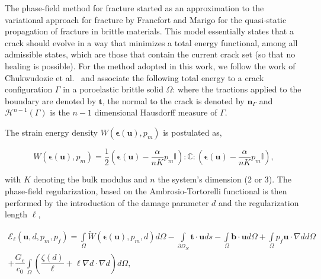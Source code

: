 The phase-field method for fracture started as an approximation \cite{bourdin2000numerical} to the variational approach for fracture by Francfort and Marigo \cite{francfort1998revisiting} for the quasi-static propagation of fracture in brittle materials. This model essentially states that a crack should evolve in a way that minimizes a total energy functional, among all admissible states, which are those that contain the current crack set (so that no healing is possible). For the method adopted in this work, we follow the work of Chukwudozie et al.\ \cite{chukwudozie2019variational} and associate the following total energy to a crack configuration $\Gamma$ in a poroelastic brittle solid $\Omega$:
where the tractions applied to the boundary are denoted by $\textbf{t}$, the normal to the crack is denoted by $\textbf{n}_{\Gamma}$ and $\mathcal{H}^{n-1}(\Gamma)$ is the $n-1$ dimensional Hausdorff measure of $\Gamma$. 

The strain energy density $W(\boldsymbol{\epsilon}(\textbf{u}), p_m)$ is postulated as,

\begin{equation}
    W(\boldsymbol{\epsilon}(\textbf{u}), p_m) = \dfrac{1}{2}\left( \boldsymbol\epsilon(\textbf{u}) - \dfrac{\alpha}{nK} p_m\mathbb{I}\right) : \mathbb{C} : \left( \boldsymbol\epsilon(\textbf{u}) - \dfrac{\alpha}{nK} p_m\mathbb{I}\right),
\end{equation}

with $K$ denoting the bulk modulus and $n$ the system's dimension (2 or 3). The phase-field regularization, based on the Ambrosio-Tortorelli \cite{ambrosio1990approximation} functional is then performed by the introduction of the damage parameter $d$ and the regularization length $\ell$,

\begin{multline}\label{Poroelastic PF funcional}
    \mathcal{E}_{\ell}(\textbf{u},d,p_m,p_f) = \int\limits_{\Omega }\widetilde{W}(\boldsymbol{\epsilon}(\textbf{u}), p_m, d)d\Omega - \int\limits_{\partial\Omega_N}\textbf{t} \cdot \textbf{u} ds
    - \int\limits_{\Omega} \textbf{b} \cdot \textbf{u} d\Omega
    + \int\limits_{\Omega}p_f \textbf{u} \cdot \nabla d d\Omega \\
    + \dfrac{G_c}{c_0}\int\limits_{\Omega }\left(\dfrac{\zeta(d)}{\ell} + \ell\nabla d\cdot\nabla d  \right)d\Omega,
\end{multline}

